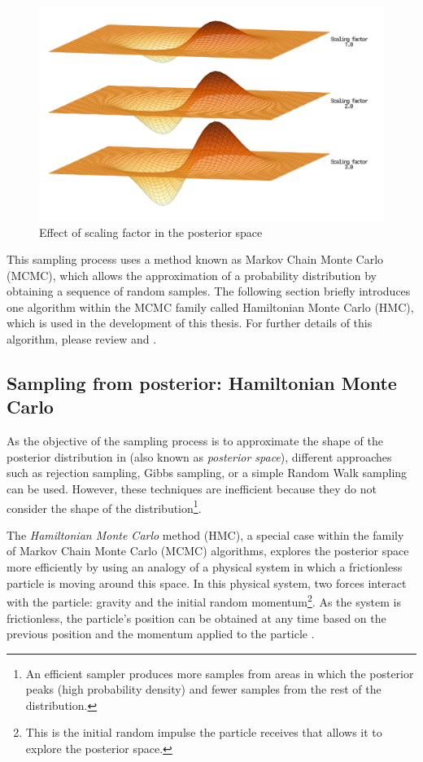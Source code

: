 \begin{figure}[H]
    \centering
    \includegraphics[width=1.0\textwidth]{images/ch3_scaling_posterior_space/scaling_posterior.png}
    \caption{Effect of scaling factor in the posterior space}
    \label{fig:scalling_posterior}
\end{figure}

This sampling process uses a method known as Markov Chain Monte Carlo (MCMC), which allows the approximation of a probability distribution by obtaining a sequence of random samples. The following section briefly introduces one algorithm within the MCMC family called Hamiltonian Monte Carlo (HMC), which is used in the development of this thesis. For further details of this algorithm, please review \citep{Lambert2018} and \citep{Neal2012}.

\subsection{Sampling from posterior: Hamiltonian Monte Carlo }

As the objective of the sampling process is to approximate the shape of the posterior distribution in  (also known as \textit{posterior space}), different approaches such as rejection sampling, Gibbs sampling, or a simple Random Walk sampling can be used. However, these techniques are inefficient because they do not consider the shape of the distribution\footnote{An efficient sampler produces more samples from areas in which the posterior peaks (high probability density) and fewer samples from the rest of the distribution.}. 

The \textit{Hamiltonian Monte Carlo} method (HMC), a special case within the family of Markov Chain Monte Carlo (MCMC) algorithms, explores the posterior space more efficiently by using an analogy of a physical system in which a frictionless particle is moving around this space. In this physical system, two forces interact with the particle: gravity and the initial random momentum\footnote{This is the initial random impulse the particle receives that allows it to explore the posterior space.}. As the system is frictionless, the particle's position can be obtained at any time based on the previous position and the momentum applied to the particle \citep{Gelman2013,Lambert2018,McElreath2016,Neal2012}. 

